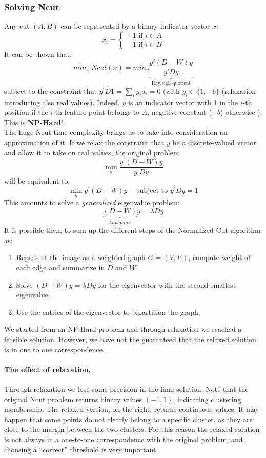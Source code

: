 \subsubsection{Solving Ncut} 
Any cut $(A,B)$ can be represented by a binary indicator vector $x$:
$$x_i = \begin{cases}
+1 \text{  if } i \in A\\
-1 \text{  if } i \in B
\end{cases}$$
It can be shown that:
$$min_x ~ Ncut(x) = min_y \underbrace{\frac{y'(D-W)y}{y'Dy}}_{\text{Rayleigh quotient}}$$
subject to the constraint that $y ^ { \prime } D1 = \sum_{i} y_{i} d _ { i } = 0$ (with $y _ { i } \in \{ 1 , - b \}$ (relaxation introducing also real values). Indeed, $y$ is an indicator vector with 1 in the $i$-th position if the $i$-th feature point belongs to $A$, negative constant ($-b$) otherwise ). This is \textbf{NP-Hard}!\\
The huge Ncut time complexity brings us to take into consideration an approximation of it. If we relax the constraint that $y$ be a discrete-valued vector and allow it to take on real values, the original problem
$$\min _ { y } \frac { y ^ { \prime } ( D - W ) y } { y ^ { \prime } D y }$$
will be equivalent to:
$$\min _ { y } y ^ { \prime } ( D - W ) y \quad \text { subject to } y ^ { \prime } D y = 1$$
This amounts to solve a \textit{generalized} eigenvalue problem:
$$\underbrace{(D-W)}_{Laplacian}y=\lambda D y$$
It is possible then, to sum up the different steps of the Normalized Cut algorithm as:
\begin{enumerate}
	\item Represent the image as a weighted graph $G = (V,E)$, compute weight of each edge and summarize in $D$ and $W$.
	\item Solve $(D-W)y = \lambda Dy$ for the eigenvector with the second smallest eigenvalue.
	\item Use the entries of the eigenvector to bipartition the graph.
\end{enumerate}
We started from an NP-Hard problem and through relaxation we reached a feasible solution. However, we have not the guaranteed that the relaxed solution is in one to one correspondence.

\paragraph*{The effect of relaxation.} Through relaxation we lose some precision in the final solution. 
Note that the original Ncut problem returns binary values $(-1,1)$, indicating clustering membership. The relaxed version, on the right, returns continuous values. It may happen that some points do not clearly belong to a specific cluster, as they are close to the margin between the two clusters. For this reason the relaxed solution is not always in a one-to-one correspondence with the original problem, and choosing a ``correct'' threshold is very important.

